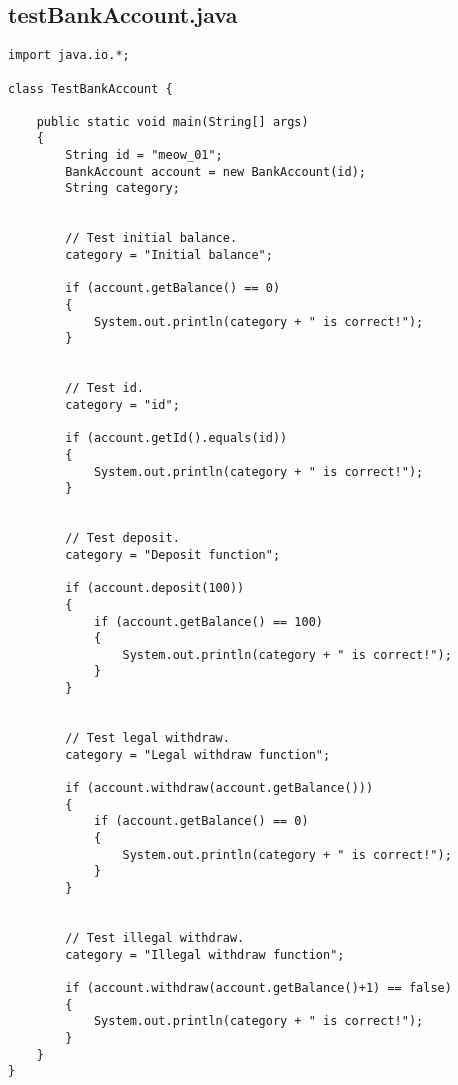 \documentclass[a4paper,12pt]{article}
\begin{document}
\subsection{\textsf{testBankAccount.java}}
\begin{verbatim}
import java.io.*;

class TestBankAccount {
    
    public static void main(String[] args)
    {
        String id = "meow_01";
        BankAccount account = new BankAccount(id);
        String category;


        // Test initial balance.
        category = "Initial balance";

        if (account.getBalance() == 0)
        {
            System.out.println(category + " is correct!");
        }


        // Test id.
        category = "id";

        if (account.getId().equals(id))
        {
            System.out.println(category + " is correct!");
        }


        // Test deposit.
        category = "Deposit function";

        if (account.deposit(100))
        {
            if (account.getBalance() == 100)
            {
                System.out.println(category + " is correct!");
            }
        }


        // Test legal withdraw.
        category = "Legal withdraw function";

        if (account.withdraw(account.getBalance()))
        {
            if (account.getBalance() == 0)
            {
                System.out.println(category + " is correct!");
            }
        }


        // Test illegal withdraw.
        category = "Illegal withdraw function";

        if (account.withdraw(account.getBalance()+1) == false)
        {
            System.out.println(category + " is correct!");
        }
    }
}
\end{verbatim}

\newpage
\end{document}
